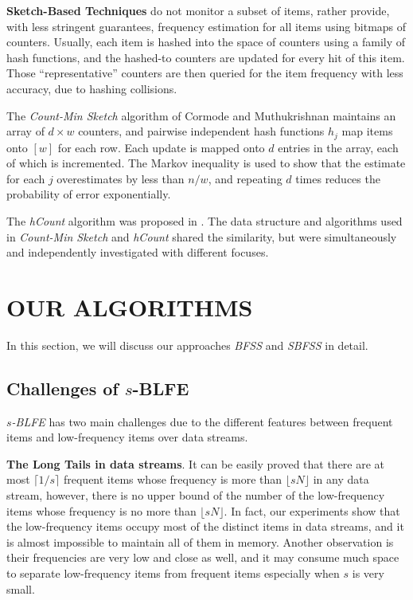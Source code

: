 \documentclass[conference]{IEEEtran}
\begin{document}
\textbf{Sketch-Based Techniques} do not monitor a subset of items, rather provide, with less stringent guarantees, frequency estimation for all items using bitmaps of counters. Usually, each item is hashed into the space of counters using a family of hash functions, and the hashed-to counters are updated for every hit of this item. Those “representative” counters are then queried for the item frequency with less accuracy, due to hashing collisions.\par

The \emph{Count-Min Sketch} algorithm of Cormode and Muthukrishnan \cite{IEEEexample:count-min} maintains an array of $d\times w$ counters, and pairwise independent hash functions $h_j$ map items onto $[w]$ for each row. Each update is mapped onto $d$ entries in the array, each of which is incremented. The Markov inequality is used to show that the estimate for each $j$ overestimates by less than $n/w$, and repeating $d$ times reduces the probability of error exponentially.\par

The \emph{hCount} algorithm was proposed in \cite{IEEEexample:hcount}. The data structure and algorithms used in \emph{Count-Min Sketch} and \emph{hCount} shared the similarity, but were simultaneously and independently investigated with different focuses.

\section{OUR ALGORITHMS}
In this section, we will discuss our approaches \emph{BFSS} and \emph{SBFSS} in detail.
\subsection{Challenges of $s$-BLFE}
$s$\emph{-BLFE} has two main challenges due to the different features between frequent items and low-frequency items over data streams.\par

\textbf{The Long Tails in data streams}. It can be easily proved that there are at most $\lceil1/s\rceil$ frequent items whose frequency is more than $\lfloor sN\rfloor$ in any data stream, however, there is no upper bound of the number of the low-frequency items whose frequency is no more than $\lfloor sN\rfloor$. In fact, our experiments show that the low-frequency items occupy most of the distinct items in data streams, and it is almost impossible to maintain all of them in memory. Another observation is their frequencies are very low and close as well, and it may consume much space to separate low-frequency items from frequent items especially when $s$ is very small.\par
\end{document}

